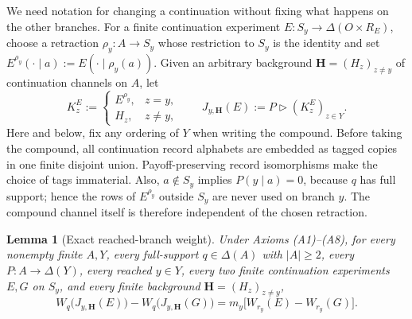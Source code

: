 \documentclass[11pt,a4paper]{article}
\newtheorem{lemma}[theorem]{Lemma}
\theoremstyle{definition}
\newcommand{\D}{\Delta}
\newcommand{\1}{\mathbf 1}
\begin{document}
We need notation for changing a continuation without fixing what happens on
the other branches.  For a finite continuation experiment
$E:S_y\to\D(O\times R_E)$, choose a retraction
$\rho_y:A\to S_y$ whose restriction to $S_y$ is the identity and set
$E^{\rho_y}(\cdot\mid a):=E(\cdot\mid\rho_y(a))$.  Given an arbitrary
background $\mathbf H=(H_z)_{z\ne y}$ of continuation channels on $A$, let
\[
K_z^E:=
\begin{cases}
E^{\rho_y},&z=y,\\
H_z,&z\ne y,
\end{cases}
\qquad
J_{y,\mathbf H}(E):=P\triangleright(K_z^E)_{z\in Y}.
\]
Here and below, fix any ordering of $Y$ when writing the compound.
Before taking the compound, all continuation record alphabets are embedded as
tagged copies in one finite disjoint union.  Payoff-preserving record
isomorphisms make the choice of tags immaterial.  Also,
$a\notin S_y$ implies $P(y\mid a)=0$, because $q$ has full support; hence the
rows of $E^{\rho_y}$ outside $S_y$ are never used on branch $y$.
The compound channel itself is therefore independent of the chosen
retraction.

\begin{lemma}[Exact reached-branch weight]\label{lf:lem:branch-weight}
Under Axioms \textup{(A1)--(A8)}, for every nonempty finite $A,Y$, every
full-support $q\in\D(A)$ with $\lvert A\rvert\ge2$, every
$P:A\to\D(Y)$, every reached $y\in Y$, every two finite continuation
experiments $E,G$ on $S_y$, and every finite background
$\mathbf H=(H_z)_{z\ne y}$,
\begin{equation}
W_q\bigl(J_{y,\mathbf H}(E)\bigr)
-W_q\bigl(J_{y,\mathbf H}(G)\bigr)
=m_y\bigl[W_{r_y}(E)-W_{r_y}(G)\bigr].
\label{lf:eq:branch-weight}
\end{equation}
\end{lemma}
\end{document}
